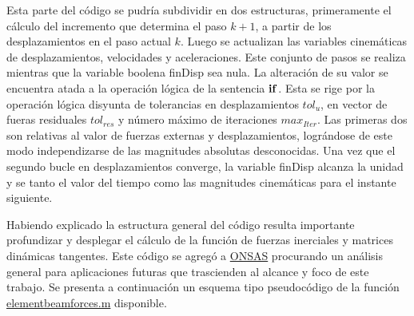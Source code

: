 Esta parte del código se pudría subdividir en dos estructuras, primeramente el cálculo del incremento que determina el paso $k+1$, a partir de los desplazamientos en el paso actual $k$. Luego se actualizan las variables cinemáticas de desplazamientos, velocidades y aceleraciones. Este conjunto de pasos se realiza mientras que la variable boolena finDisp sea nula. La alteración de su valor se encuentra atada a la operación lógica de la sentencia $\bf{if}$. Esta se rige por la operación lógica disyunta de tolerancias en desplazamientos $tol_u$, en vector de fueras residuales $tol_{res}$ y número máximo de iteraciones $max_{Iter}$. Las primeras dos son relativas al valor de fuerzas externas y desplazamientos, lográndose de este modo independizarse de las magnitudes absolutas desconocidas. Una vez que el segundo bucle en desplazamientos converge, la variable finDisp alcanza la unidad y se tanto el valor del tiempo como las magnitudes cinemáticas para el instante siguiente.

Habiendo explicado la estructura general del código resulta importante profundizar y desplegar el cálculo de la función de fuerzas inerciales y matrices dinámicas tangentes. Este código se agregó a \href{https://github.com/ONSAS/ONSAS/}{ONSAS} procurando un análisis general para aplicaciones futuras que trascienden al alcance y foco de este trabajo. Se presenta a continuación un esquema tipo pseudocódigo de la función \href{https://github.com/ONSAS/ONSAS/blob/master/src/elementBeamForces.m}{elementbeamforces.m} disponible.

